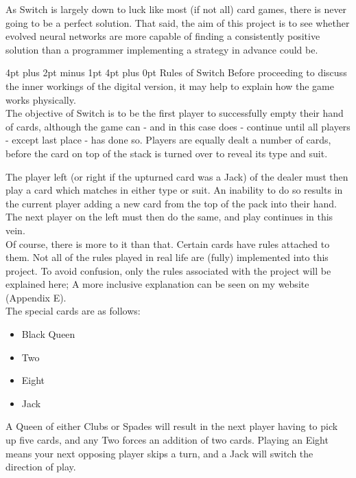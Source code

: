 \documentclass[12pt,a4paper]{article}
\makeatletter
\renewcommand\section{\@startsection {section}{1}{0mm} %
                               {4pt plus 2pt minus 1pt} %
                               {4pt plus 0pt} %
                               {\bfseries}}
\makeatother
\begin{document}
As Switch is largely down to luck like most (if not all) card games, there is never going to be a perfect solution. That said, the aim of this project is to see whether evolved neural networks are more capable of finding a consistently positive solution than a programmer implementing a strategy in advance could be. 

\newpage
\section{Rules of Switch}
Before proceeding to discuss the inner workings of the digital version, it may help to explain how the game works physically.\\

The objective of Switch is to be the first player to successfully empty their hand of cards, although the game can - and in this case does - continue until all players - except last place - has done so. Players are equally dealt a number of cards, before the card on top of the stack is turned over to reveal its type and suit. 

The player left (or right if the upturned card was a Jack) of the dealer must then play a card which matches in either type or suit. An inability to do so results in the current player adding a new card from the top of the pack into their hand. The next player on the left must then do the same, and play continues in this vein.\\

Of course, there is more to it than that. Certain cards have rules attached to them. Not all of the rules played in real life are (fully) implemented into this project. To avoid confusion, only the rules associated with the project will be explained here; A more inclusive explanation can be seen on my website (Appendix E).\\

The special cards are as follows:
\begin{itemize}
	\item Black Queen
	\item Two
	\item Eight
	\item Jack
\end{itemize}

A Queen of either Clubs or Spades will result in the next player having to pick up five cards, and any Two forces an addition of two cards. Playing an Eight means your next opposing player skips a turn, and a Jack will switch the direction of play. 
\end{document}
